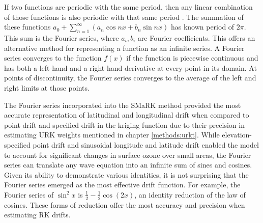 If two functions are periodic with the same period, then any linear combination of those functions is also periodic with that same period \parencite{woods2012}. The summation of these functions $a_0 + \sum_{n=1}^\infty (a_n\cos nx +b_n\sin nx)$ has known period of $2\pi$. This sum is the Fourier series, where $a_i,b_i$ are Fourier coefficients. This offers an alternative method for representing a function as an infinite series. A Fourier series converges to the function $f(x)$ if the function is piecewise continuous and has both a left-hand and a right-hand derivative at every point in its domain. At points of discontinuity, the Fourier series converges to the average of the left and right limits at those points.

The Fourier series incorporated into the SMaRK method provided the most accurate representation of latitudinal and longitudinal drift when compared to point drift and specified drift in the kriging function due to their precision in estimating URK weights mentioned in chapter \ref{methods:urkt}. While elevation-specified point drift and sinusoidal longitude and latitude drift enabled the model to account for significant changes in surface ozone over small areas, the Fourier series can translate any wave equation into an infinite sum of sines and cosines. Given its ability to demonstrate various identities, it is not surprising that the Fourier series emerged as the most effective drift function. For example, the Fourier series of $\sin^2 x$ is $\frac{1}{2}-\frac{1}{2}\cos(2x)$, an identity reduction of the law of cosines. These forms of reduction offer the most accuracy and precision when estimating RK drifts.
